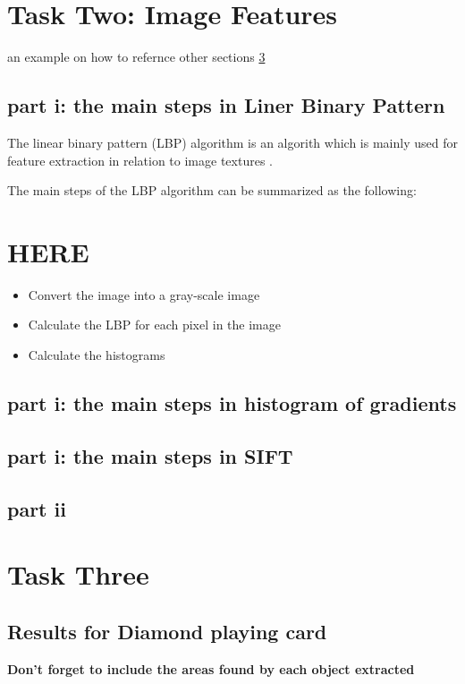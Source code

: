 \documentclass[conference]{IEEEtran}
\begin{document}
\section{Task Two: Image Features} \label{two}
an example on how to refernce other sections \ref{three}
\subsection{part i: the main steps in Liner Binary Pattern}
The linear binary pattern (LBP) algorithm is an algorith which is mainly used for feature extraction in relation to image textures \cite{b5}. \par

The main steps of the LBP algorithm can be summarized as the following:
\section{HERE}
\begin{itemize}
	\item Convert the image into a gray-scale image
	\item Calculate the LBP for each pixel in the image
	\item Calculate the histograms 
\end{itemize}

\subsection{part i: the main steps in histogram of gradients}

\subsection{part i: the main steps in SIFT} 
\subsection{part ii} \label{two ii}

\section{Task Three} \label{three}
\subsection{Results for Diamond playing card}

\textbf{Don't forget to include the areas found by each object extracted}
\end{document}

